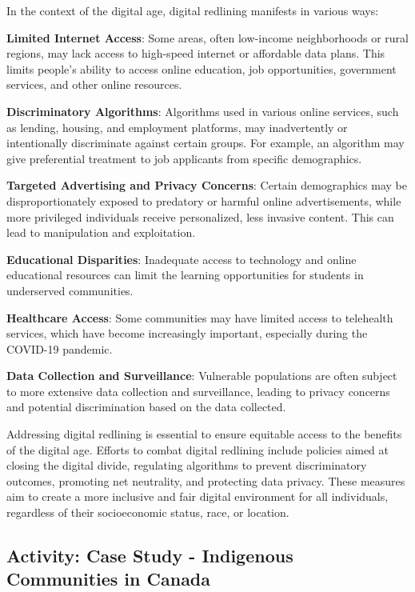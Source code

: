 \documentclass[
]{book}
\theoremstyle{definition}
\theoremstyle{definition}
\theoremstyle{definition}
\theoremstyle{definition}
\theoremstyle{remark}
\begin{document}
In the context of the digital age, digital redlining manifests in various ways:

\textbf{Limited Internet Access}: Some areas, often low-income neighborhoods or rural regions, may lack access to high-speed internet or affordable data plans. This limits people's ability to access online education, job opportunities, government services, and other online resources.

\textbf{Discriminatory Algorithms}: Algorithms used in various online services, such as lending, housing, and employment platforms, may inadvertently or intentionally discriminate against certain groups. For example, an algorithm may give preferential treatment to job applicants from specific demographics.

\textbf{Targeted Advertising and Privacy Concerns}: Certain demographics may be disproportionately exposed to predatory or harmful online advertisements, while more privileged individuals receive personalized, less invasive content. This can lead to manipulation and exploitation.

\textbf{Educational Disparities}: Inadequate access to technology and online educational resources can limit the learning opportunities for students in underserved communities.

\textbf{Healthcare Access}: Some communities may have limited access to telehealth services, which have become increasingly important, especially during the COVID-19 pandemic.

\textbf{Data Collection and Surveillance}: Vulnerable populations are often subject to more extensive data collection and surveillance, leading to privacy concerns and potential discrimination based on the data collected.

Addressing digital redlining is essential to ensure equitable access to the benefits of the digital age. Efforts to combat digital redlining include policies aimed at closing the digital divide, regulating algorithms to prevent discriminatory outcomes, promoting net neutrality, and protecting data privacy. These measures aim to create a more inclusive and fair digital environment for all individuals, regardless of their socioeconomic status, race, or location.

\hypertarget{activity-case-study---indigenous-communities-in-canada}{%
\subsection*{Activity: Case Study - Indigenous Communities in Canada}\label{activity-case-study---indigenous-communities-in-canada}}
\end{document}
